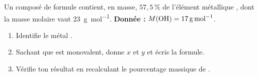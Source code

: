 \documentclass[11pt,a4paper]{article}
\begin{document}
\begin{exo}
Un composé de formule  contient, en masse, $57{,}5\,\%$ de l'élément métallique
, dont la masse molaire vaut \qty{23}{\gram\per\mol}. \textbf{Donnée :}
$M(\ce{OH})=\qty{17}{\gram\per\mol}$.
\begin{enumerate}[label=\alph*)]
  \item Identifie le métal .
  \item Sachant que  est monovalent, donne $x$ et $y$ et écris la formule.
  \item Vérifie ton résultat en recalculant le pourcentage massique de .
\end{enumerate}
\end{exo}
\end{document}

